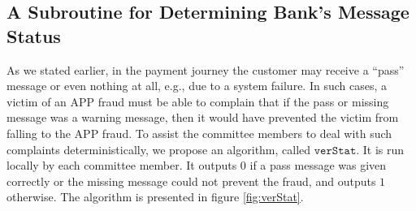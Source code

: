 

\subsection{A Subroutine for Determining Bank's Message Status}

As we stated earlier, in the payment journey the customer may receive a ``pass'' message or even nothing at all, e.g., due to a system failure. In such cases,  a victim of  an APP fraud must be able to complain that if the pass or missing message was   a warning message, then it   would have prevented the victim from falling to the APP fraud. To assist the committee members to deal with  such complaints deterministically, we propose an algorithm,  called $\mathtt{verStat}$. It is run locally by each committee member. It outputs $0$ if a pass message was given correctly or the missing message could not  prevent the fraud, and outputs $1$ otherwise. The algorithm is presented in figure \ref{fig:verStat}.


